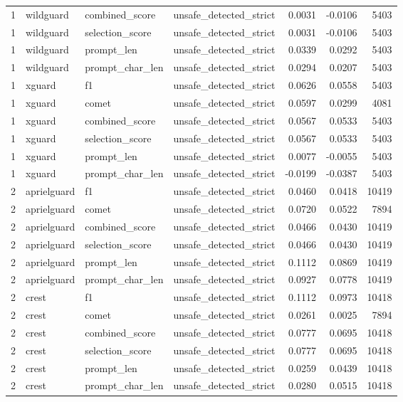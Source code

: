 \begin{tabular}{rlllrrr}
1 & wildguard & combined\_score & unsafe\_detected\_strict & 0.0031 & -0.0106 & 5403 \\
1 & wildguard & selection\_score & unsafe\_detected\_strict & 0.0031 & -0.0106 & 5403 \\
1 & wildguard & prompt\_len & unsafe\_detected\_strict & 0.0339 & 0.0292 & 5403 \\
1 & wildguard & prompt\_char\_len & unsafe\_detected\_strict & 0.0294 & 0.0207 & 5403 \\
1 & xguard & f1 & unsafe\_detected\_strict & 0.0626 & 0.0558 & 5403 \\
1 & xguard & comet & unsafe\_detected\_strict & 0.0597 & 0.0299 & 4081 \\
1 & xguard & combined\_score & unsafe\_detected\_strict & 0.0567 & 0.0533 & 5403 \\
1 & xguard & selection\_score & unsafe\_detected\_strict & 0.0567 & 0.0533 & 5403 \\
1 & xguard & prompt\_len & unsafe\_detected\_strict & 0.0077 & -0.0055 & 5403 \\
1 & xguard & prompt\_char\_len & unsafe\_detected\_strict & -0.0199 & -0.0387 & 5403 \\
2 & aprielguard & f1 & unsafe\_detected\_strict & 0.0460 & 0.0418 & 10419 \\
2 & aprielguard & comet & unsafe\_detected\_strict & 0.0720 & 0.0522 & 7894 \\
2 & aprielguard & combined\_score & unsafe\_detected\_strict & 0.0466 & 0.0430 & 10419 \\
2 & aprielguard & selection\_score & unsafe\_detected\_strict & 0.0466 & 0.0430 & 10419 \\
2 & aprielguard & prompt\_len & unsafe\_detected\_strict & 0.1112 & 0.0869 & 10419 \\
2 & aprielguard & prompt\_char\_len & unsafe\_detected\_strict & 0.0927 & 0.0778 & 10419 \\
2 & crest & f1 & unsafe\_detected\_strict & 0.1112 & 0.0973 & 10418 \\
2 & crest & comet & unsafe\_detected\_strict & 0.0261 & 0.0025 & 7894 \\
2 & crest & combined\_score & unsafe\_detected\_strict & 0.0777 & 0.0695 & 10418 \\
2 & crest & selection\_score & unsafe\_detected\_strict & 0.0777 & 0.0695 & 10418 \\
2 & crest & prompt\_len & unsafe\_detected\_strict & 0.0259 & 0.0439 & 10418 \\
2 & crest & prompt\_char\_len & unsafe\_detected\_strict & 0.0280 & 0.0515 & 10418 \\

\end{tabular}
